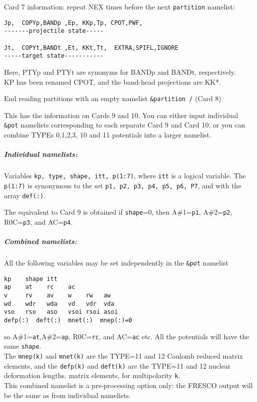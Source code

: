 \documentclass[11pt]{article}
\begin{document}
Card 7 information: repeat NEX times before the next {\tt partition} namelist:
\begin{verbatim}
Jp,  COPYp,BANDp ,Ep, KKp,Tp, CPOT,PWF,
-------projectile state-----

Jt,  COPYt,BANDt ,Et, KKt,Tt,  EXTRA,SPIFL,IGNORE
-----target state-----------
\end{verbatim}
Here, PTYp and PTYt are synonyms for BANDp and BANDt, respectively.\\
KP has been renamed CPOT, and the band-head projections are KK*.

\bigskip
End reading partitions with an empty namelist {\tt \&partition /} (Card 8)


This has the information on Cards 9 and 10.
You can either input individual {\tt \&pot} namelists corresponding to each
separate Card 9 and Card 10, or you can combine TYPEs 0,1,2,3, 10 and 11 potentials
into a larger namelist.

\subparagraph*{Individual namelists:}

Variables {\tt kp, type, shape, itt, p(1:7)}, where {\tt itt} is a logical variable.
The {\tt p(1:7)} is synonymous to the set {\tt p1, p2, p3, p4, p5, p6, P7},
and with the array {\tt def(:)}.

The equivalent to Card 9 is obtained if {\tt shape}=0,
then  A\#1={\tt p1}, A\#2={\tt p2},  R0C={\tt p3}, and AC={\tt p4}.


\subparagraph*{Combined namelists:}
All the following variables may be set independently in the {\tt \&pot} namelist
\begin{verbatim}
kp    shape itt
ap    at    rc    ac
v     rv    av    w    rw   aw
wd    wdr   wda   vd   vdr  vda
vso   rso   aso   vsoi rsoi asoi
defp(:)  deft(:)  mnet(:)  mnep(:)=0
\end{verbatim}
so  A\#1={\tt at},A\#2={\tt ap},  R0C={\tt rc}, and AC={\tt ac} etc.
All the potentials will have the same {\tt shape}.\\
The {\tt mnep(k)} and {\tt mnet(k)} are the TYPE=11 and 12 Coulomb reduced matrix elements,
and
the {\tt defp(k)} and {\tt deft(k)} are the TYPE=11 and 12 nuclear deformation lengths.
matrix elements, for multipolarity {\tt k}.\\
This combined namelist is a pre-processing option only: the FRESCO output
will be the same as from individual namelists.
\end{document}
